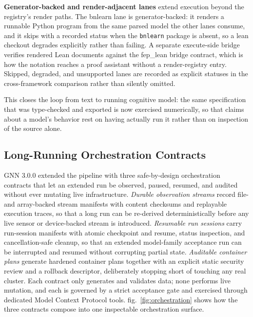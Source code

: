 \documentclass[
  english,
  9pt,
]{extarticle}
\newcounter{none} %
\begin{document}
\textbf{Generator-backed and render-adjacent lanes} extend execution
beyond the registry's render paths. The bnlearn lane is
generator-backed: it renders a runnable Python program from the same
parsed model the other lanes consume, and it skips with a recorded
status when the \texttt{bnlearn} package is absent, so a lean checkout
degrades explicitly rather than failing. A separate execute-side bridge
verifies rendered Lean documents against the fep\_lean bridge contract,
which is how the notation reaches a proof assistant without a
render-registry entry. Skipped, degraded, and unsupported lanes are
recorded as explicit statuses in the cross-framework comparison rather
than silently omitted.

This closes the loop from text to running cognitive model: the same
specification that was type-checked and exported is now exercised
numerically, so that claims about a model's behavior rest on having
actually run it rather than on inspection of the source alone.

\subsection{Long-Running Orchestration
Contracts}\label{long-running-orchestration-contracts}

GNN 3.0.0 extended the pipeline with three safe-by-design orchestration
contracts that let an extended run be observed, paused, resumed, and
audited without ever mutating live infrastructure. \emph{Durable
observation streams} record file- and array-backed stream manifests with
content checksums and replayable execution traces, so that a long run
can be re-derived deterministically before any live sensor or
device-backed stream is introduced. \emph{Resumable run sessions} carry
run-session manifests with atomic checkpoint and resume, status
inspection, and cancellation-safe cleanup, so that an extended
model-family acceptance run can be interrupted and resumed without
corrupting partial state. \emph{Auditable container plans} generate
hardened container plans together with an explicit static security
review and a rollback descriptor, deliberately stopping short of
touching any real cluster. Each contract only generates and validates
data; none performs live mutation, and each is governed by a strict
acceptance gate and exercised through dedicated Model Context Protocol
tools. fig.~\ref{fig:orchestration} shows how the three contracts
compose into one inspectable orchestration surface.
\end{document}
